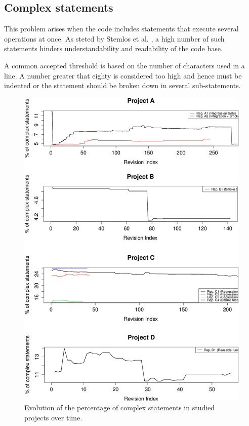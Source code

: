 \subsection{Complex statements}
This problem arises when the code includes statements that execute several operations at once. As steted by Stemlos et al. \cite{metrics_source_code}, a high number of such statements hinders understandability and readability of the code base.

A common accepted threshold is based on the number of characters used in a line. A number greater that eighty is considered too high and hence must be indented or the statement should be broken down in several sub-statements.

\begin{figure}[!htbp]
    \centering
    \includegraphics[width=\textwidth,keepaspectratio]{figure/results/rq1/perc-complex-statements.pdf}
    \caption{Evolution of the percentage of complex statements in studied projects over time.}
    \label{fig:perc-complex-statements}
\end{figure}


